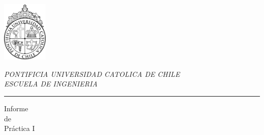 
\noindent
\begin{minipage}[c]{2.19cm}
\includegraphics[width=2.18cm]{./logo_uc.png}
\end{minipage}
\begin{minipage}[c]{0.9\linewidth}
\begin{center}
\vspace{16pt}
\fontsize{16pt}{24pt}\textit{PONTIFICIA UNIVERSIDAD CATOLICA DE CHILE \\[12pt] ESCUELA DE INGENIERIA}
\vspace{-5pt} 

\noindent\rule{14cm}{1.5pt}
\end{center}
\end{minipage}
\vspace{170pt}
\begin{center}
{\fontsize{26pt}{39pt}\selectfont Informe} \\[9pt] 
{\fontsize{26pt}{39pt}\selectfont de} \\[9pt] 
{\fontsize{26pt}{39pt}\selectfont Práctica I}
\end{center}
\null
\vfill

\noindent
{}\\[12pt]
\\[12pt]
\\[12pt]


\thispagestyle{empty}
\clearpage
\setcounter{page}{1}